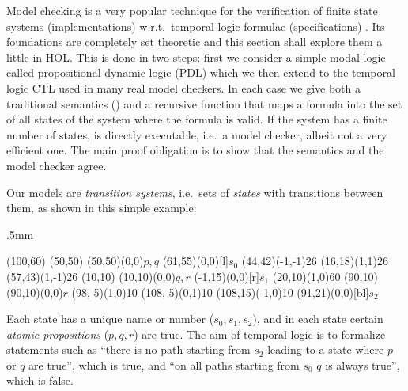 %
\begin{isabellebody}%
\def\isabellecontext{Base}%
%
%
\begin{isamarkuptext}%
Model checking is a very popular technique for the verification of finite
state systems (implementations) w.r.t.\ temporal logic formulae
(specifications) \cite{ClarkeGP-book,Huth-Ryan-book}. Its foundations are completely set theoretic
and this section shall explore them a little in HOL. This is done in two steps: first
we consider a simple modal logic called propositional dynamic
logic (PDL) which we then extend to the temporal logic CTL used in many real
model checkers. In each case we give both a traditional semantics (\isa{{\isasymTurnstile}}) and a
recursive function  that maps a formula into the set of all states of
the system where the formula is valid. If the system has a finite number of
states,  is directly executable, i.e.\ a model checker, albeit not a
very efficient one. The main proof obligation is to show that the semantics
and the model checker agree.

\underscoreon

Our models are \emph{transition systems}, i.e.\ sets of \emph{states} with
transitions between them, as shown in this simple example:
\begin{center}
\unitlength.5mm
\thicklines
\begin{picture}(100,60)
\put(50,50){}
\put(50,50){\makebox(0,0){$p,q$}}
\put(61,55){\makebox(0,0)[l]{$s_0$}}
\put(44,42){\vector(-1,-1){26}}
\put(16,18){\vector(1,1){26}}
\put(57,43){\vector(1,-1){26}}
\put(10,10){}
\put(10,10){\makebox(0,0){$q,r$}}
\put(-1,15){\makebox(0,0)[r]{$s_1$}}
\put(20,10){\vector(1,0){60}}
\put(90,10){}
\put(90,10){\makebox(0,0){$r$}}
\put(98, 5){\line(1,0){10}}
\put(108, 5){\line(0,1){10}}
\put(108,15){\vector(-1,0){10}}
\put(91,21){\makebox(0,0)[bl]{$s_2$}}
\end{picture}
\end{center}
Each state has a unique name or number ($s_0,s_1,s_2$), and in each
state certain \emph{atomic propositions} ($p,q,r$) are true.
The aim of temporal logic is to formalize statements such as ``there is no
path starting from $s_2$ leading to a state where $p$ or $q$
are true'', which is true, and ``on all paths starting from $s_0$ $q$ is always true'',
which is false.


\end{isamarkuptext}
\end{isabellebody}
